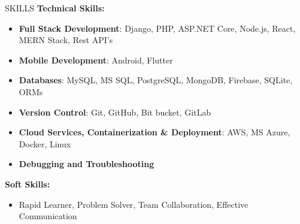\documentclass{resume} %
\begin{document}
\begin{rSection}{SKILLS}
\textbf{Technical Skills:}
\begin{itemize}
	\item \textbf{Full Stack Development}: Django, PHP, ASP.NET Core, Node.js, React, MERN Stack, Rest API's
	\item \textbf{Mobile Development}: Android, Flutter
	\item \textbf{Databases}: MySQL, MS SQL, PostgreSQL, MongoDB, Firebase, SQLite, ORMs
	\item \textbf{Version Control}: Git, GitHub, Bit bucket, GitLab
	\item \textbf{Cloud Services, Containerization \& Deployment}: AWS, MS Azure, Docker, Linux
	\item \textbf{Debugging and Troubleshooting}
	
\end{itemize}


\textbf{Soft Skills:} 
\begin{itemize}
\item Rapid Learner, Problem Solver, Team Collaboration, Effective Communication
\end{itemize}


\end{rSection}
  
\end{document}
